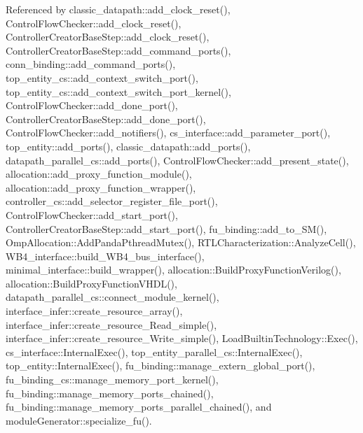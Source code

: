 Referenced by classic\+\_\+datapath\+::add\+\_\+clock\+\_\+reset(), Control\+Flow\+Checker\+::add\+\_\+clock\+\_\+reset(), Controller\+Creator\+Base\+Step\+::add\+\_\+clock\+\_\+reset(), Controller\+Creator\+Base\+Step\+::add\+\_\+command\+\_\+ports(), conn\+\_\+binding\+::add\+\_\+command\+\_\+ports(), top\+\_\+entity\+\_\+cs\+::add\+\_\+context\+\_\+switch\+\_\+port(), top\+\_\+entity\+\_\+cs\+::add\+\_\+context\+\_\+switch\+\_\+port\+\_\+kernel(), Control\+Flow\+Checker\+::add\+\_\+done\+\_\+port(), Controller\+Creator\+Base\+Step\+::add\+\_\+done\+\_\+port(), Control\+Flow\+Checker\+::add\+\_\+notifiers(), cs\+\_\+interface\+::add\+\_\+parameter\+\_\+port(), top\+\_\+entity\+::add\+\_\+ports(), classic\+\_\+datapath\+::add\+\_\+ports(), datapath\+\_\+parallel\+\_\+cs\+::add\+\_\+ports(), Control\+Flow\+Checker\+::add\+\_\+present\+\_\+state(), allocation\+::add\+\_\+proxy\+\_\+function\+\_\+module(), allocation\+::add\+\_\+proxy\+\_\+function\+\_\+wrapper(), controller\+\_\+cs\+::add\+\_\+selector\+\_\+register\+\_\+file\+\_\+port(), Control\+Flow\+Checker\+::add\+\_\+start\+\_\+port(), Controller\+Creator\+Base\+Step\+::add\+\_\+start\+\_\+port(), fu\+\_\+binding\+::add\+\_\+to\+\_\+\+S\+M(), Omp\+Allocation\+::\+Add\+Panda\+Pthread\+Mutex(), R\+T\+L\+Characterization\+::\+Analyze\+Cell(), W\+B4\+\_\+interface\+::build\+\_\+\+W\+B4\+\_\+bus\+\_\+interface(), minimal\+\_\+interface\+::build\+\_\+wrapper(), allocation\+::\+Build\+Proxy\+Function\+Verilog(), allocation\+::\+Build\+Proxy\+Function\+V\+H\+D\+L(), datapath\+\_\+parallel\+\_\+cs\+::connect\+\_\+module\+\_\+kernel(), interface\+\_\+infer\+::create\+\_\+resource\+\_\+array(), interface\+\_\+infer\+::create\+\_\+resource\+\_\+\+Read\+\_\+simple(), interface\+\_\+infer\+::create\+\_\+resource\+\_\+\+Write\+\_\+simple(), Load\+Builtin\+Technology\+::\+Exec(), cs\+\_\+interface\+::\+Internal\+Exec(), top\+\_\+entity\+\_\+parallel\+\_\+cs\+::\+Internal\+Exec(), top\+\_\+entity\+::\+Internal\+Exec(), fu\+\_\+binding\+::manage\+\_\+extern\+\_\+global\+\_\+port(), fu\+\_\+binding\+\_\+cs\+::manage\+\_\+memory\+\_\+port\+\_\+kernel(), fu\+\_\+binding\+::manage\+\_\+memory\+\_\+ports\+\_\+chained(), fu\+\_\+binding\+::manage\+\_\+memory\+\_\+ports\+\_\+parallel\+\_\+chained(), and module\+Generator\+::specialize\+\_\+fu().

